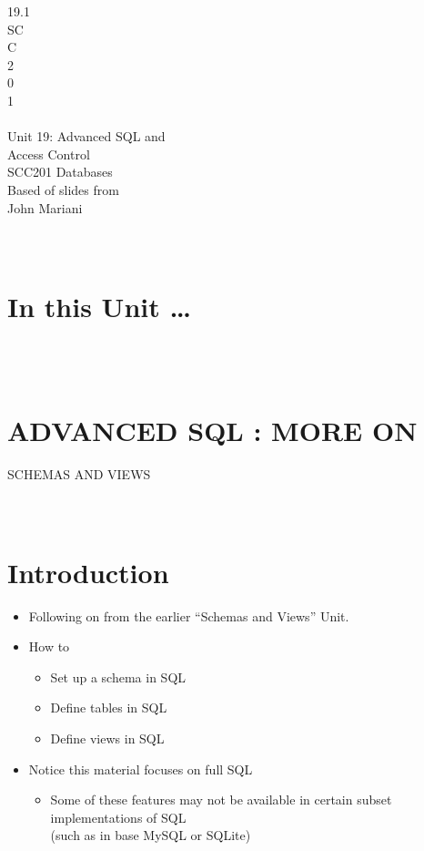 \documentclass[12pt]{article}
\begin{document}
19.1\\
SC\\
C\\
 2\\
0\\
1\\
 \\
Unit 19: Advanced SQL and \\
Access Control\\
SCC201 Databases\\
Based of slides from\\
John Mariani\\
\\ 
 \\
\section{In this Unit …}
\\ 
 \\
\section{ADVANCED SQL : MORE ON }
SCHEMAS AND VIEWS\\
\\ 
 \\
\section{Introduction}
\begin{itemize}
  \item Following on from the earlier “Schemas and 
Views” Unit.\\
  \item How to
\begin{itemize}
  \item Set up a schema in SQL
  \item Define tables in SQL
  \item Define views in SQL
\end{itemize}
  \item Notice this material focuses on full SQL
\begin{itemize}
  \item Some of these features may not be available in 
certain subset implementations of SQL\\
(such as in base MySQL or SQLite)\\
\end{itemize}
\end{itemize}
\\ 
 \\
\end{document}
